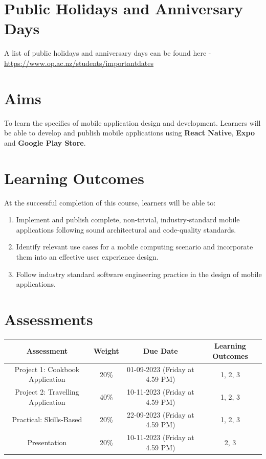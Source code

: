 \documentclass{article}
\begin{document}
\section*{Public Holidays and Anniversary Days}
A list of public holidays and anniversary days can be found here - \href{https://www.op.ac.nz/students/importantdates}{https://www.op.ac.nz/students/importantdates}

\section*{Aims}
To learn the specifics of mobile application design and development. Learners will be able to develop and publish mobile applications using \textbf{React Native}, \textbf{Expo} and \textbf{Google Play Store}.

\section*{Learning Outcomes}
At the successful completion of this course, learners will be able to:
\begin{enumerate}
	\item Implement and publish complete, non-trivial, industry-standard mobile applications following sound architectural and code-quality standards.
	\item Identify relevant use cases for a mobile computing scenario and incorporate them into an effective user experience design.
	\item Follow industry standard software engineering practice in the design of mobile applications.
\end{enumerate} 

\section*{Assessments}
\renewcommand{\arraystretch}{1.5}
\begin{tabular}{|c|c|c|c|}
	\hline
	\textbf{Assessment} & \textbf{Weight} & \textbf{Due Date}    & \textbf{Learning Outcomes} \\ \hline
	Project 1: Cookbook Application            & 20\%            & 01-09-2023 (Friday at 4.59 PM)  & 1, 2, 3                    \\ \hline
	Project 2: Travelling Application            & 40\%            & 10-11-2023 (Friday at 4.59 PM)  & 1, 2, 3                    \\ \hline
	Practical: Skills-Based           & 20\%            & 22-09-2023 (Friday at 4.59 PM)  & 1, 2, 3                    \\ \hline
	Presentation       & 20\%            & 10-11-2023 (Friday at 4.59 PM) & 2, 3                       \\ \hline
	
\end{tabular}
\end{document}
